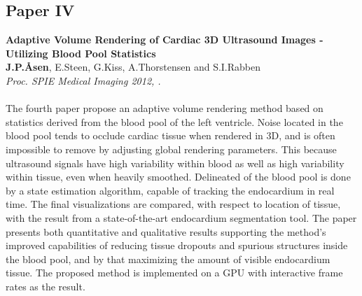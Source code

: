 \subsection{Paper IV}
\textbf{Adaptive Volume Rendering of Cardiac 3D Ultrasound Images - Utilizing Blood Pool Statistics}\\
\textbf{J.\:P.\:\AA{}sen}, E.\:Steen, G.\:Kiss, A.\:Thorstensen and S.\:I.\:Rabben\\
{\it Proc. SPIE Medical Imaging 2012, .}\\\\
The fourth paper propose an adaptive volume rendering method based on statistics derived from the blood pool of the left ventricle. Noise located in the blood pool tends to occlude cardiac tissue when rendered in 3D, and is often impossible to remove by adjusting global rendering parameters. This because ultrasound signals have high variability within blood as well as high variability within tissue, even when heavily smoothed. Delineated of the blood pool is done by a state estimation algorithm, capable of tracking the endocardium in real time. The final visualizations are compared, with respect to location of tissue, with the result from a state-of-the-art endocardium segmentation tool. The paper presents both quantitative and qualitative results supporting the method's improved capabilities of reducing tissue dropouts and spurious structures inside the blood pool, and by that maximizing the amount of visible endocardium tissue. The proposed method is implemented on a GPU with interactive frame rates as the result.


